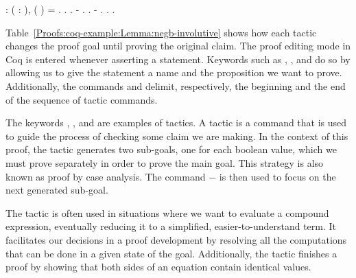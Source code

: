\begin{coqdoccode}
	\coqdocemptyline
	\coqdocnoindent
	  : \coqdockw{\ensuremath{\forall}} ( : ),\coqdoceol
	\coqdocindent{1.00em}
	 ( ) = .\coqdoceol
	\coqdocnoindent
	.\coqdoceol
	\coqdocindent{1.00em}
	 .\coqdoceol
	\coqdocindent{1.00em}
	- . .\coqdoceol
	\coqdocindent{1.00em}
	- . .\coqdoceol
	\coqdocnoindent
	.\coqdoceol
\end{coqdoccode}

Table~\ref{Proofs:coq-example:Lemma:negb-involutive} shows how each tactic changes the proof goal until proving the original claim. The proof editing mode in Coq is entered whenever asserting a statement. Keywords such as , , and  do so by allowing us to give the statement a name and the proposition we want to prove. Additionally, the commands  and  delimit, respectively, the beginning and the end of the sequence of tactic commands.

The keywords , , and  are examples of tactics. A tactic is a command that is used to guide the process of checking some claim we are making. In the context of this proof, the tactic  generates two sub-goals, one for each boolean value, which we must prove separately in order to prove the main goal. This strategy is also known as proof by case analysis. The command $-$ is then used to focus on the next generated sub-goal.

The tactic  is often used in situations where we want to evaluate a compound expression, eventually reducing it to a simplified, easier-to-understand term. It facilitates our decisions in a proof development by resolving all the computations that can be done in a given state of the goal. Additionally, the tactic  finishes a proof by showing that both sides of an equation contain identical values.

